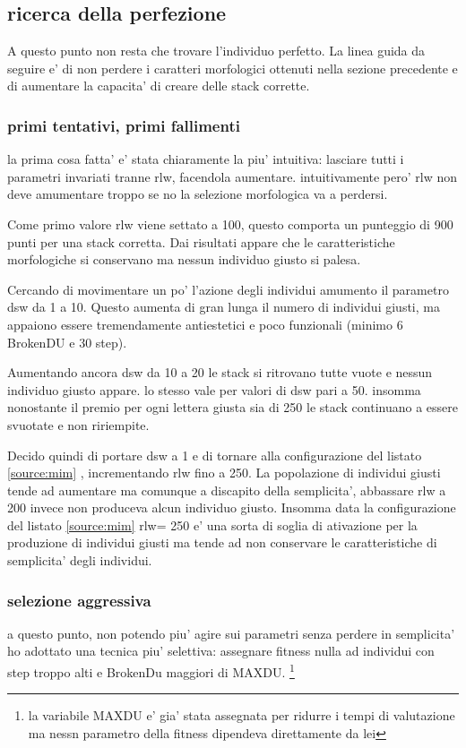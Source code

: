 \documentclass[12pt, a4paper]{article}
\begin{document}
\subsection{ricerca della perfezione}
A questo punto non resta che trovare l'individuo perfetto. La linea guida da seguire e' di non perdere i caratteri morfologici ottenuti nella sezione precedente e di aumentare la capacita' di creare delle stack corrette.
\subsubsection{primi tentativi, primi fallimenti}
la prima cosa fatta' e' stata chiaramente la piu' intuitiva: lasciare tutti i parametri invariati tranne rlw, facendola aumentare.
intuitivamente pero' rlw non deve amumentare troppo se no la selezione morfologica va a perdersi.

Come primo valore rlw viene settato a 100, questo comporta un punteggio di 900 punti per una stack corretta.
Dai risultati appare che le caratteristiche morfologiche si conservano ma nessun individuo giusto si palesa.

Cercando di movimentare un po' l'azione degli individui amumento il parametro dsw da 1 a 10.
Questo aumenta di gran lunga il numero di individui giusti, ma appaiono essere tremendamente antiestetici e poco funzionali (minimo 6 BrokenDU e 30 step).

Aumentando ancora dsw da 10 a 20 le stack si ritrovano tutte vuote e nessun individuo giusto appare.
lo stesso vale per valori di dsw pari a 50. insomma nonostante il premio per ogni lettera giusta sia di 250 le stack continuano a essere svuotate e non ririempite.

Decido quindi di portare dsw a 1 e di tornare alla configurazione del listato \ref{source:mim} , incrementando rlw fino a 250.
La popolazione di individui giusti tende ad aumentare ma comunque a discapito della semplicita', abbassare rlw a 200 invece non produceva alcun individuo giusto.
Insomma data la configurazione del listato \ref{source:mim} rlw= 250 e' una sorta di soglia di ativazione per la produzione di individui giusti ma tende ad non conservare le caratteristiche di semplicita' degli individui.

\subsubsection{selezione aggressiva}
a questo punto, non potendo piu' agire sui parametri senza perdere in semplicita' ho adottato una tecnica piu' selettiva:
assegnare fitness nulla ad individui con step troppo alti e BrokenDu maggiori di MAXDU.
\footnote{la variabile MAXDU e' gia' stata assegnata per ridurre i tempi di valutazione ma nessn parametro della fitness dipendeva direttamente da lei}
\end{document}
